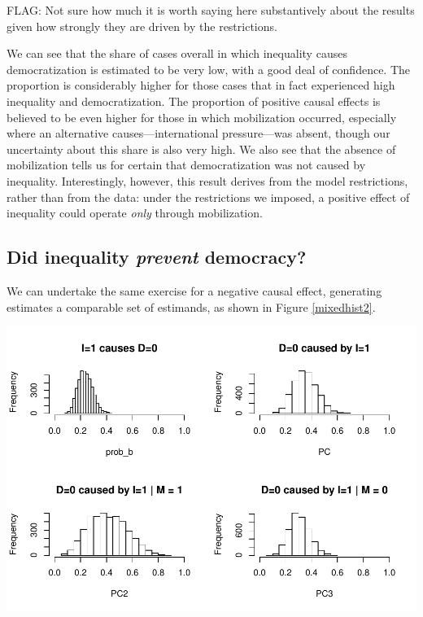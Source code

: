 \documentclass[12pt,]{book}
\begin{document}
FLAG: Not sure how much it is worth saying here substantively about the results given how strongly they are driven by the restrictions.

We can see that the share of cases overall in which inequality causes democratization is estimated to be very low, with a good deal of confidence. The proportion is considerably higher for those cases that in fact experienced high inequality and democratization. The proportion of positive causal effects is believed to be even higher for those in which mobilization occurred, especially where an alternative causes---international pressure---was absent, though our uncertainty about this share is also very high. We also see that the absence of mobilization tells us for certain that democratization was not caused by inequality. Interestingly, however, this result derives from the model restrictions, rather than from the data: under the restrictions we imposed, a positive effect of inequality could operate \emph{only} through mobilization.

\hypertarget{did-inequality-prevent-democracy}{%
\subsection{\texorpdfstring{Did inequality \emph{prevent} democracy?}{Did inequality prevent democracy?}}\label{did-inequality-prevent-democracy}}

We can undertake the same exercise for a negative causal effect, generating estimates a comparable set of estimands, as shown in Figure \ref{mixedhist2}.

\includegraphics{ii_files/figure-latex/mixedhist2-1.pdf}
\end{document}
